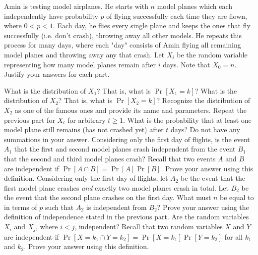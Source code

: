\documentclass[11pt]{article}
\begin{document}
Amin is testing model airplanes. He starts with $n$ model planes which each 
independently have probability $p$ of flying successfully each time they are 
flown, where $0<p<1$. Each day, he flies every single plane and keeps the ones 
that fly successfully (i.e. don't crash), throwing away all other models. He 
repeats this process for many days, where each "day" consists of Amin flying all 
remaining model planes and throwing away any that crash. Let $X_i$ be the random 
variable representing how many model planes remain after $i$ days. Note that 
$X_0 = n$. Justify your answers for each part.
\begin{Parts}
    \Part What is the distribution of $X_1$? That is, what is $\Pr[X_1=k]$? 
    \Part What is the distribution of $X_2$? That is, what is $\Pr[X_2=k]$? 
    Recognize the distribution of $X_2$ as one of the famous ones and provide 
    its name and parameters.
    \Part Repeat the previous part for $X_t$ for arbitrary $t \geq 1$.
    \Part What is the probability that at least one model plane still remains 
    (has not crashed yet) after $t$ days? Do not have any summations in your 
    answer.
    \Part Considering only the first day of flights, is the event $A_1$ that the 
    first and second model planes crash independent from the event $B_1$ that 
    the second and third model planes crash? Recall that two events $A$ and $B$ 
    are independent if $\Pr[A\cap B] = \Pr[A]\Pr[B]$. Prove your answer using 
    this definition.
    \Part Considering only the first day of flights, let $A_2$ be the event that 
    the first model plane crashes 
    \emph{and} exactly two model planes crash in total. Let $B_2$ be the event 
    that 
    the second plane crashes on the first day. What must $n$ be equal to 
    in terms of $p$ such that $A_2$ is independent from $B_2$? Prove your answer 
    using the definition 
    of independence stated in the previous part.
    \Part Are the random variables $X_i$ and $X_j$, where $i<j$, independent? 
    Recall that two random variables $X$ and $Y$ are independent if $\Pr[X=k_1 
    \cap Y=k_2] = \Pr[X=k_1]\Pr[Y=k_2]$ for all $k_1$ and $k_2$. Prove your answer 
    using this definition.
\end{Parts}
\end{document}
